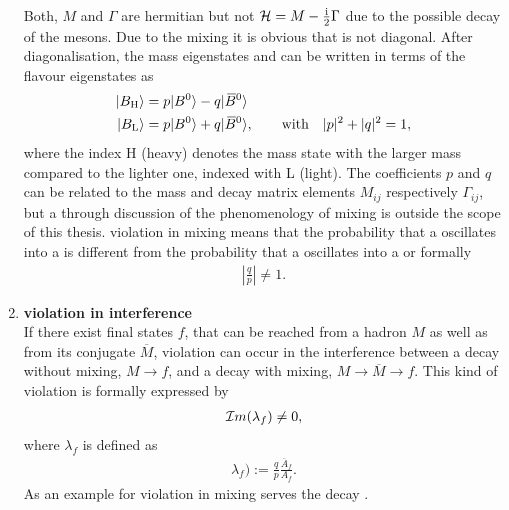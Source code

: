 \begin{enumerate}
          Both, $M$ and $\Gamma$ are hermitian but not $\mathcal{H} = M - \frac{\mathrm{i}}{2} \Gamma$ due to the possible decay of the mesons.
          Due to the mixing it is obvious that \Ham is not diagonal.
          After diagonalisation, the mass eigenstates  and  can be written in terms of the flavour eigenstates as
          \begin{align}
              \ket{B_{\text{H}}\vphantom{\text{\Bdb}}} &= p \ket{\text{\Bd}\vphantom{\text{\Bdb}}} - q \ket{\text{\Bdb}} \label{eq:b_heavy}\\ 
              \ket{B_{\text{L}}\vphantom{\text{\Bdb}}} &= p \ket{\text{\Bd}\vphantom{\text{\Bdb}}} + q \ket{\text{\Bdb}}, \qquad \text{with} \quad |p|^2 + |q|^2 = 1, \label{eq:b_light}
          \end{align}
          where the index H (heavy) denotes the mass state with the larger mass compared to the lighter one, indexed with L (light).
          The coefficients $p$ and $q$ can be related to the mass and decay matrix elements $M_{ij}$ respectively $\Gamma_{ij}$, but a through discussion of the phenomenology of mixing is outside the scope of this thesis.
          \CP violation in mixing means that the probability that a \Bd oscillates into a \Bdb is different from the probability that a \Bdb oscillates into a \Bd or formally
          \begin{align}
              \left|\frac{q}{p}\right| \neq 1.
          \end{align}
    \item \textbf{\CP violation in interference} \\
          If there exist final states $f$, that can be reached from a hadron $M$ as well as from its \CP conjugate $\overline{M}$, \CP violation can occur in the interference between a decay without mixing, $M \to f$, and a decay with mixing, $M \to \overline{M} \to f$.
          This kind of \CP violation is formally expressed by
          \begin{align}
              \mathcal{I}m(\lambda_f) \neq 0,
          \end{align}
          where $\lambda_f$ is defined as
          \begin{align}
              \lambda_f) := \frac{q}{p} \frac{\overline{A}_f}{A_f}.
          \end{align}
          As an example for \CP violation in mixing serves the decay \decay{\Bd/\Bdb}{\jpsi\KS}.
\end{enumerate}

